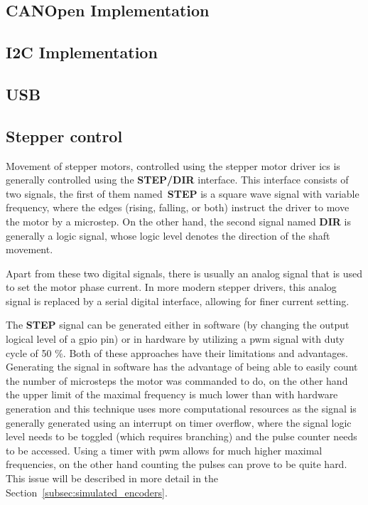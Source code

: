 \subsection{CANOpen Implementation}
\label{subsec:canopen_impl}

\subsection{I2C Implementation}
\label{subsec:i2c_impl}

\subsection{USB}
\label{subsec:usb_impl}

\subsection{Stepper control}
\label{subsec:stepper_control}
Movement of stepper motors, controlled using the stepper motor driver \acs{ic}s is generally controlled using the \textbf{STEP/DIR} interface.
This interface consists of two signals, the first of them named~\textbf{STEP} is a square wave signal with variable frequency, where the edges (rising, falling, or both) instruct the driver to move the motor by a microstep.
On the other hand, the second signal named \textbf{DIR} is generally a logic signal, whose logic level denotes the direction of the shaft movement.

Apart from these two digital signals, there is usually an analog signal that is used to set the motor phase current.
In more modern stepper drivers, this analog signal is replaced by a serial digital interface, allowing for finer current setting.

The \textbf{STEP} signal can be generated either in software (by changing the output logical level of a \acs{gpio} pin) or in hardware by utilizing a \acs{pwm} signal with duty cycle of 50 \%.
Both of these approaches have their limitations and advantages.
Generating the signal in software has the advantage of being able to easily count the number of microsteps the motor was commanded to do, on the other hand the upper limit of the maximal frequency is much lower than with hardware generation and this technique uses more computational resources as the signal is generally generated using an interrupt on timer overflow, where the signal logic level needs to be toggled (which requires branching) and the pulse counter needs to be accessed.
Using a timer with \acs{pwm} allows for much higher maximal frequencies, on the other hand counting the pulses can prove to be quite hard.
This issue will be described in more detail in the Section~\ref{subsec:simulated_encoders}.

